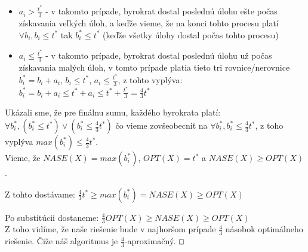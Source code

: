 \documentclass[a4paper]{article}
\begin{document}
\begin{itemize}
	\item $a_i > \frac{t^*}{3}$ - v takomto prípade, byrokrat dostal poslednú úlohu ešte počas získavania veľkých úloh, a keďže vieme, že na konci tohto procesu platí $\forall b_i, b_i \leq t^*$ tak $b^*_i \leq t^*$ (keďže všetky úlohy dostal počas tohto procesu)
	\item $a_i \leq \frac{t^*}{3}$ - v takomto prípade, byrokrat dostal poslednú úlohu už počas získavania malých úloh, v tomto prípade platia tieto tri rovnice/nerovnice  $b^*_i = b_i + a_i$, $b_i \leq t^*$,  $a_i \leq \frac{t^*}{3}$, z tohto vyplýva: $b^*_i = b_i + a_i \leq t^* + a_i \leq t^* + \frac{t^*}{3} =  \frac{4}{3} t^*$ 
\end{itemize}

Ukázali sme, že pre finálnu sumu, každého byrokrata platí: $\forall b^*_i, (b^*_i \leq t^*) \lor (b^*_i \leq  \frac{4}{3} t^*) $ čo vieme zovšeobecniť na $\forall b^*_i, b^*_i \leq  \frac{4}{3} t^*$, z toho vyplýva $max(b^*_i)  \leq  \frac{4}{3} t^*$. 
\\

Vieme, že $NASE(X) = max(b^*_i)$, $OPT(X) = t^*$ a $NASE(X) \geq OPT(X)$. 

Z tohto dostávame:  $\frac{4}{3} t^* \geq max(b^*_i) = NASE(X) \geq OPT(X)$

Po substitúcii dostaneme: $\frac{4}{3} OPT(X) \geq NASE(X) \geq OPT(X)$
\\

Z toho vidíme, že naše riešenie bude v najhoršom prípade $\frac{4}{3}$ násobok optimálneho riešenie. Čiže náš algoritmus je $\frac{4}{3}$-aproximačný. $\oblong$  
\end{document}
